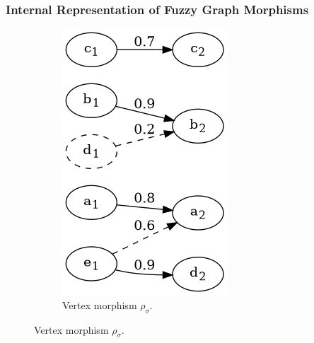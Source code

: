 \begin{frame}
	\frametitle{Internal Representation of Fuzzy Graph Morphisms}


	\begin{figure}[htbp]
		\centering
		\begin{subfigure}[t]{0.20\textwidth}
			\centering
			\includegraphics[width=\linewidth,valign=t]{inc/fuzzy_graph_theory/fuzzy_graph_morphism_internal_rho_sigma.png}
			\caption{Vertex morphism $\rho_{\sigma}$.}
		\end{subfigure}

\end{figure}
\end{frame}
